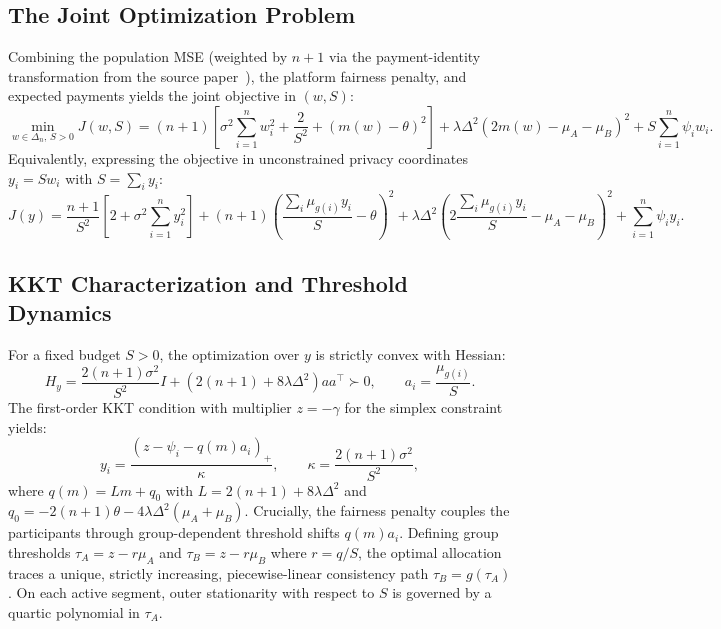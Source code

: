 \documentclass[11pt,a4paper]{article}
\begin{document}
\subsection{The Joint Optimization Problem}

Combining the population MSE (weighted by $n+1$ via the payment-identity transformation from the source paper~\cite{fallah2023optimal}), the platform fairness penalty, and expected payments yields the joint objective in $(w, S)$:
\begin{equation}
    \min_{w \in \Delta_n,\, S > 0} J(w, S) = (n+1)\left[ \sigma^2 \sum_{i=1}^n w_i^2 + \frac{2}{S^2} + (m(w) - \theta)^2 \right] + \lambda \Delta^2 (2m(w) - \mu_A - \mu_B)^2 + S \sum_{i=1}^n \psi_i w_i.
    \label{eq:full_objective}
\end{equation}
Equivalently, expressing the objective in unconstrained privacy coordinates $y_i = S w_i$ with $S = \sum_i y_i$:
\begin{equation}
    J(y) = \frac{n+1}{S^2} \left[ 2 + \sigma^2 \sum_{i=1}^n y_i^2 \right] + (n+1)\left(\frac{\sum_i \mu_{g(i)}y_i}{S} - \theta\right)^2 + \lambda \Delta^2 \left( 2\frac{\sum_i \mu_{g(i)}y_i}{S} - \mu_A - \mu_B \right)^2 + \sum_{i=1}^n \psi_i y_i.
\end{equation}

\subsection{KKT Characterization and Threshold Dynamics}

For a fixed budget $S > 0$, the optimization over $y$ is strictly convex with Hessian:
\begin{equation}
    H_y = \frac{2(n+1)\sigma^2}{S^2} I + \left(2(n+1) + 8\lambda\Delta^2\right) a a^\top \succ 0, \qquad a_i = \frac{\mu_{g(i)}}{S}.
\end{equation}
The first-order KKT condition with multiplier $z = -\gamma$ for the simplex constraint yields:
\begin{equation}
    y_i = \frac{\left(z - \psi_i - q(m) a_i\right)_+}{\kappa}, \qquad \kappa = \frac{2(n+1)\sigma^2}{S^2},
\end{equation}
where $q(m) = Lm + q_0$ with $L = 2(n+1) + 8\lambda\Delta^2$ and $q_0 = -2(n+1)\theta - 4\lambda\Delta^2(\mu_A+\mu_B)$.
Crucially, the fairness penalty couples the participants through group-dependent threshold shifts $q(m) a_i$. Defining group thresholds $\tau_A = z - r\mu_A$ and $\tau_B = z - r\mu_B$ where $r = q/S$, the optimal allocation traces a unique, strictly increasing, piecewise-linear consistency path $\tau_B = g(\tau_A)$. On each active segment, outer stationarity with respect to $S$ is governed by a quartic polynomial in $\tau_A$.
\end{document}
